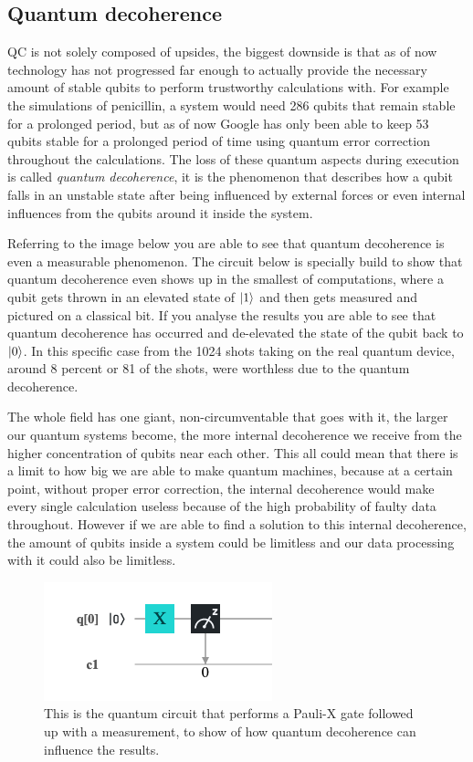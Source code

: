\subsection{Quantum decoherence}

QC is not solely composed of upsides, the biggest downside is that as of now technology has not progressed far enough to actually provide the necessary amount of stable qubits to perform trustworthy calculations with. For example the simulations of penicillin, a system would need 286 qubits that remain stable for a prolonged period, but as of now  Google has only been able to keep 53 qubits stable for a prolonged period of time using quantum error correction throughout the calculations. The loss of these quantum aspects during execution is called \textit{quantum decoherence}, it is the phenomenon that describes how a qubit falls in an unstable state after being influenced by external forces or even internal influences from the qubits around it inside the system.

Referring to the image below you are able to see that quantum decoherence is even a measurable phenomenon. The circuit below is specially build to show that quantum decoherence even shows up in the smallest of computations, where a qubit gets thrown in an elevated state of $\ket{1}$ and then gets measured and pictured on a classical bit. If you analyse the results you are able to see that quantum decoherence has occurred and de-elevated the state of the qubit back to $\ket{0}$. In this specific case from the 1024 shots taking on the real quantum device, around 8 percent or 81 of the shots, were worthless due to the quantum decoherence.  

The whole field has one giant, non-circumventable that goes with it, the larger our quantum systems become, the more internal decoherence we receive from the higher concentration of qubits near each other. This all could mean that there is a limit to how big we are able to make quantum machines, because at a certain point, without proper error correction, the internal decoherence would make every single calculation useless because of the high probability of faulty data throughout. However if we are able to find a solution to this internal decoherence, the amount of qubits inside a system could be limitless and our data processing with it could also be limitless. \autocite{Hartnett2019}

\begin{figure}[h]
	\centering
	\includegraphics[scale = 0.75]{../Demonstration/img/Quantum_decoherence_circuit.PNG}
	\caption{This is the quantum circuit that performs a Pauli-X gate followed up with a measurement, to show of how quantum decoherence can influence the results.}
\end{figure}

